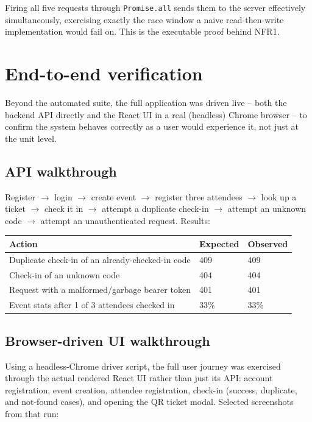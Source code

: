 ﻿\documentclass[11pt,letterpaper]{report}
\newcommand{\code}[1]{\lstinline[breaklines=true]{#1}}
\begin{document}
Firing all five requests through \code{Promise.all} sends them to the
server effectively simultaneously, exercising exactly the race window
a naive read-then-write implementation would fail on. This is the
executable proof behind NFR1.

\section{End-to-end verification}

Beyond the automated suite, the full application was driven live --
both the backend API directly and the React UI in a real (headless)
Chrome browser -- to confirm the system behaves correctly as a user
would experience it, not just at the unit level.

\subsection{API walkthrough}

Register $\rightarrow$ login $\rightarrow$ create event $\rightarrow$
register three attendees $\rightarrow$ look up a ticket $\rightarrow$
check it in $\rightarrow$ attempt a duplicate check-in $\rightarrow$
attempt an unknown code $\rightarrow$ attempt an unauthenticated
request. Results:

\begin{center}
\begin{tabular}{p{7.5cm}p{2cm}p{2.5cm}}
\toprule
\textbf{Action} & \textbf{Expected} & \textbf{Observed} \\
\midrule
Duplicate check-in of an already-checked-in code & 409 & 409 \\
Check-in of an unknown code & 404 & 404 \\
Request with a malformed/garbage bearer token & 401 & 401 \\
Event stats after 1 of 3 attendees checked in & 33\% & 33\% \\
\bottomrule
\end{tabular}
\end{center}

\subsection{Browser-driven UI walkthrough}

Using a headless-Chrome driver script, the full user journey was
exercised through the actual rendered React UI rather than just its
API: account registration, event creation, attendee registration,
check-in (success, duplicate, and not-found cases), and opening the QR
ticket modal. Selected screenshots from that run:
\end{document}

